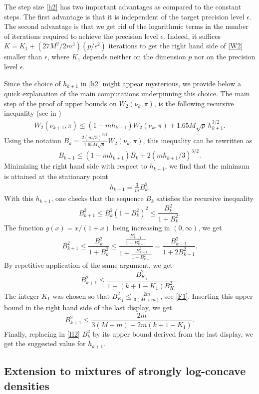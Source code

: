 \documentclass[aoap,preprint,reqno,a4paper]{imsart} %
\newcommand{\eps}{\epsilon}
\begin{document}
The step size  \eqref{h2} has two important advantages as compared to the constant steps.
The first advantage is that it is independent of the target precision level $\epsilon$. The second
advantage is that we get rid of the logarithmic terms in the number of iterations required to achieve
the precision level $\epsilon$. Indeed, it suffices $K = K_1 + (27M^2/2m^3)(p/\eps^2)$ iterations to
get the right hand side of \eqref{W2} smaller than $\eps$, where $K_1$ depends neither on the
dimension $p$ nor on the precision level $\eps$.

Since the choice of $h_{k+1}$ in \eqref{h2} might appear mysterious, we provide below a quick explanation of the
main computations underpinning this choice.
The main step of the proof of upper bounds on $W_2(\nu_k,\pi)$, is the following recursive
inequality (see  in )
\begin{align}
W_2(\nu_{k+1},\pi) \le (1-mh_{k+1}) W_2(\nu_k,\pi) + 1.65 M\sqrt{p}\, h_{k+1}^{3/2}.
\end{align}
Using the notation $B_k = \frac{2(m/3)^{3/2}}{1.65M\sqrt{p}}W_2(\nu_k,\pi)$, this inequality
can be rewritten as
$$
B_{k+1}\le (1-mh_{k+1}) B_k + 2(mh_{k+1}/3)^{3/2}.
$$
Minimizing the right hand side with respect to $h_{k+1}$, we find that the minimum is attained at
the stationary point
\begin{align}\label{H2}
h_{k+1} = \frac{3}{m} B_k^2.
\end{align}
With this $h_{k+1}$, one checks that the sequence $B_k$ satisfies the recursive inequality
$$
B_{k+1}^2\le B_k^2(1-B_k^2)^2\le \frac{B_k^2}{1+B_k^2}.
$$
The function $g(x) = x/(1+x)$ being increasing in $(0,\infty)$, we get
$$
B_{k+1}^2\le \frac{B_k^2}{1+B_k^2}
		\le \frac{\frac{B_{k-1}^2}{1+B_{k-1}^2}}{1+\frac{B_{k-1}^2}{1+B_{k-1}^2}}
		= \frac{B_{k-1}^2}{1+2B_{k-1}^2}.
$$
By repetitive application of the same argument, we get
$$
B_{k+1}^2\le
		 \frac{B_{K_1}^2}{1+(k+1-K_1)B_{K_1}^2}.
$$
The integer $K_1$ was chosen so that $B_{K_1}^2\le \frac{2m}{3(M+m)}$, see \eqref{F1}.
Inserting this upper bound in the right hand side of the last display, we get
$$
B_{k+1}^2\le \frac{2m}{3(M+m)+2m(k+1-K_1)}.
$$
Finally, replacing in \eqref{H2} $B_k^2$ by its upper bound derived from the last display, we get
the suggested value for $h_{k+1}$.

\subsection{Extension to mixtures of strongly log-concave densities}
\label{subseq:mixt}
\end{document}
